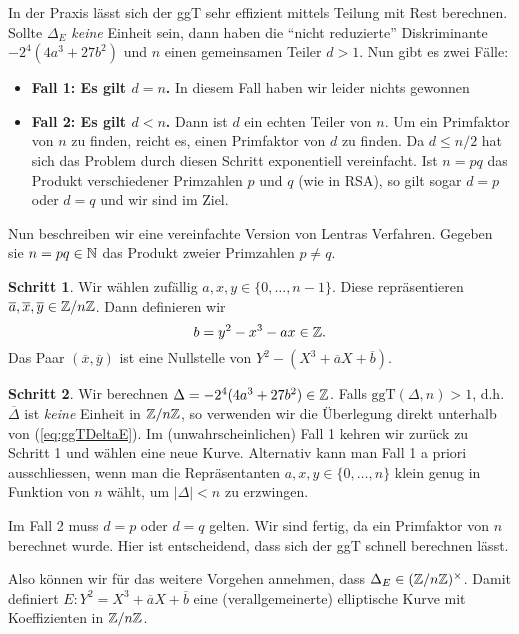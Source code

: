 In der Praxis lässt sich der ggT sehr effizient mittels Teilung
mit Rest berechnen. 
Sollte $\Delta_E$
\emph{keine} Einheit sein, dann haben die ``nicht reduzierte''
Diskriminante $-2^4(4a^3+27b^2)$ und $n$ einen gemeinsamen Teiler
$d>1$. Nun gibt es zwei Fälle:

\begin{itemize}
\item \textbf{Fall 1: Es gilt  $d=n$.}  In diesem Fall haben wir leider
  nichts gewonnen
\item \textbf{Fall 2: Es gilt  $d<n$.}
  Dann ist $d$ ein echten Teiler
  von $n$. Um ein Primfaktor von $n$ zu finden, reicht es, einen
  Primfaktor von $d$ zu finden. Da $d\le n/2$ hat sich das Problem durch
  diesen Schritt exponentiell vereinfacht. Ist $n=pq$ das Produkt verschiedener
  Primzahlen $p$ und $q$ (wie in RSA), so gilt sogar $d=p$ oder $d=q$
  und wir sind im Ziel.
\end{itemize}

Nun beschreiben wir eine vereinfachte Version von Lentras Verfahren.
Gegeben sie $n=pq\in{\mathbb{N}}$
das Produkt zweier Primzahlen $p\not=q$. 

\bigskip
\textbf{Schritt 1}. Wir wählen zufällig $a,x,y\in \{0,\ldots,n-1\}$.
Diese repräsentieren
$\overline a,\overline
x,\overline y\in{\mathbb{Z}}/n{\mathbb{Z}}$.
Dann definieren wir
$$
b = y^2 - x^3 - ax\in {\mathbb{Z}}.
$$
Das Paar $(\overline x,\overline y)$ ist eine Nullstelle von $Y^2 -
(X^3+\overline a X +\overline b)$.

\bigskip
\textbf{Schritt 2}. Wir berechnen $\Delta = -2^4(4a^3+27b^2)\in{\mathbb{Z}}$.
Falls $\mathrm{ggT}(\Delta,n)>1$, d.h. $\overline\Delta$ ist
\emph{keine} Einheit in ${\mathbb{Z}}/n{\mathbb{Z}}$, so verwenden wir die Überlegung
direkt unterhalb von (\ref{eq:ggTDeltaE}).
Im (unwahrscheinlichen) Fall 1 kehren wir zurück zu Schritt 1 und wählen eine neue Kurve.
Alternativ kann man Fall 1 a priori ausschliessen, wenn man die
Repräsentanten $a,x,y\in \{0,\ldots,n\}$ klein genug in Funktion von
$n$ wählt, um $|\Delta|<n$ zu erzwingen.

Im Fall 2 muss $d=p$ oder $d=q$ gelten. Wir sind fertig, da ein
Primfaktor von $n$ berechnet wurde. Hier ist entscheidend, dass sich
der ggT schnell berechnen lässt.

Also können wir für das weitere Vorgehen annehmen, dass
$\Delta_E\in({\mathbb{Z}}/n{\mathbb{Z}})^\times$. Damit definiert
$E : Y^2 = X^3+\overline a X + \overline b$ eine (verallgemeinerte) elliptische Kurve
mit Koeffizienten in ${\mathbb{Z}}/n{\mathbb{Z}}$.

